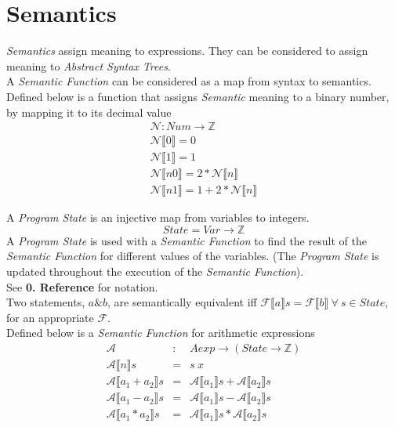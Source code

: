 \documentclass[11pt,a4paper]{article}
\begin{document}
\newpage
\section{Semantics}

\textit{Semantics} assign meaning to expressions. They can be considered to assign meaning to \textit{Abstract Syntax Trees}.\\
\NB A \textit{Semantic Function} can be considered as a map from syntax to semantics.\\

Defined below is a function that assigns \textit{Semantic} meaning to a binary number, by mapping it to its decimal value
\[\begin{array}{l}
\mathcal{N}:Num\to\mathbb{Z}\\
\mathcal{N}\llbracket 0\rrbracket=0\\
\mathcal{N}\llbracket 1\rrbracket=1\\
\mathcal{N}\llbracket  n0\rrbracket=2*\mathcal{N}\llbracket  n\rrbracket\\
\mathcal{N}\llbracket  n1\rrbracket=1+2*\mathcal{N}\llbracket  n\rrbracket
\end{array}\]

A \textit{Program State} is an injective map from variables to integers.
$$State=Var\to\mathbb{Z}$$
A \textit{Program State} is used with a \textit{Semantic Function} to find the result of the \textit{Semantic Function} for different values of the variables. (The \textit{Program State} is updated throughout the execution of the \textit{Semantic Function}).\\
\NB See \textbf{0. Reference} for notation.\\

Two statements, $a \& b$, are semantically equivalent iff $\mathcal{F}\llbracket  a\rrbracket s=\mathcal{F}\llbracket  b\rrbracket\ \forall\ s\in State$, for an appropriate $\mathcal{F}$.\\

Defined below is a \textit{Semantic Function} for arithmetic expressions
\[\begin{array}{lcl}
\mathcal{A}&:&Aexp\to(State\to\mathbb{Z})\\
\mathcal{A}\llbracket  n\rrbracket s&=&s\ x\\
\mathcal{A}\llbracket  a_1+a_2\rrbracket s&=&\mathcal{A}\llbracket  a_1\rrbracket s+\mathcal{A}\llbracket  a_2\rrbracket s\\
\mathcal{A}\llbracket  a_1-a_2\rrbracket s&=&\mathcal{A}\llbracket  a_1\rrbracket s-\mathcal{A}\llbracket  a_2\rrbracket s\\
\mathcal{A}\llbracket  a_1*a_2\rrbracket s&=&\mathcal{A}\llbracket  a_1\rrbracket s*\mathcal{A}\llbracket  a_2\rrbracket s
\end{array}\]
\end{document}
